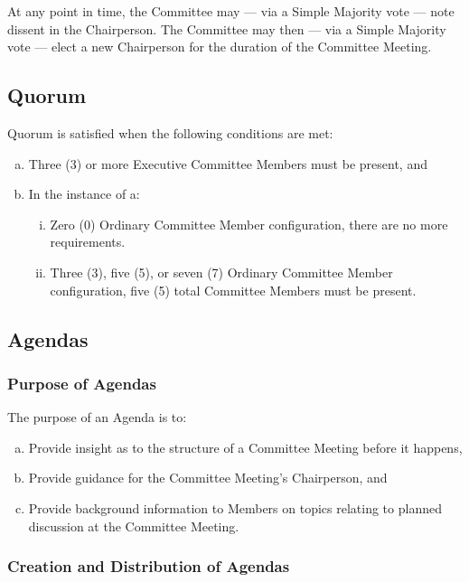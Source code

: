 \documentclass[a4paper,12pt]{article}
\begin{document}
At any point in time, the Committee may --- via a Simple Majority vote --- note dissent in the Chairperson. The Committee may then --- via a Simple Majority vote --- elect a new Chairperson for the duration of the Committee Meeting.

\subsection{Quorum}

Quorum is satisfied when the following conditions are met:

\begin{enumerate}[a)]
	\item Three (3) or more Executive Committee Members must be present, and
	\item In the instance of a:
	\begin{enumerate}[i)]
		\item Zero (0) Ordinary Committee Member configuration, there are no more requirements.
		\item Three (3), five (5), or seven (7) Ordinary Committee Member configuration, five (5) total Committee Members must be present.
	\end{enumerate}
\end{enumerate}

\subsection{Agendas}

\subsubsection{Purpose of Agendas}

The purpose of an Agenda is to:

\begin{enumerate}[a)]
	\item Provide insight as to the structure of a Committee Meeting before it happens,
	\item Provide guidance for the Committee Meeting's Chairperson, and
	\item Provide background information to Members on topics relating to planned discussion at the Committee Meeting.
\end{enumerate}

\subsubsection{Creation and Distribution of Agendas}
\end{document}
